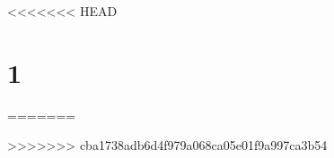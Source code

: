 


<<<<<<< HEAD
\section*{1}
=======
	\pagestyle{fancy}
	
	

>>>>>>> cba1738adb6d4f979a068ca05e01f9a997ca3b54


